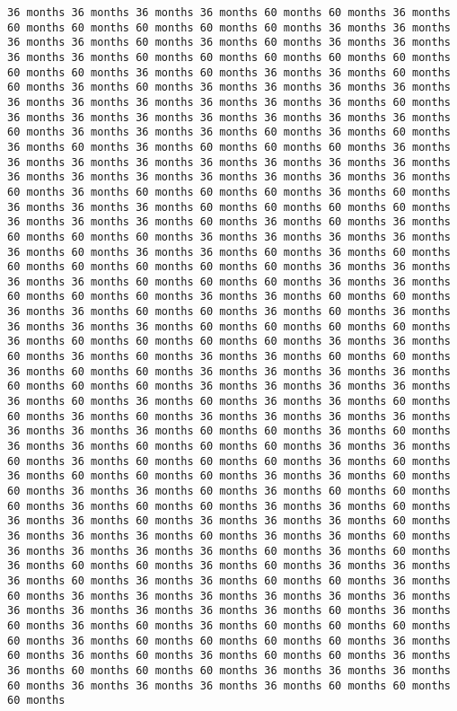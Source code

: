 \documentclass[11pt]{article}
\begin{document}
\begin{Verbatim}[commandchars=\\\{\}, frame=single, framerule=2mm, rulecolor=\color{outerrorbackground}]
36 months 36 months 36 months 36 months 60 months 60 months 36 months 60 months 60 months 60 months 60 months 60 months 36 months 36 months 36 months 36 months 60 months 36 months 60 months 36 months 36 months 36 months 36 months 60 months 60 months 60 months 60 months 60 months 60 months 60 months 36 months 60 months 36 months 36 months 60 months 60 months 36 months 60 months 36 months 36 months 36 months 36 months 36 months 36 months 36 months 36 months 36 months 36 months 60 months 36 months 36 months 36 months 36 months 36 months 36 months 36 months 60 months 36 months 36 months 36 months 60 months 36 months 60 months 36 months 60 months 36 months 60 months 60 months 60 months 36 months 36 months 36 months 36 months 36 months 36 months 36 months 36 months 36 months 36 months 36 months 36 months 36 months 36 months 36 months 60 months 36 months 60 months 60 months 60 months 36 months 60 months 36 months 36 months 36 months 60 months 60 months 60 months 60 months 36 months 36 months 36 months 60 months 36 months 60 months 36 months 60 months 60 months 60 months 36 months 36 months 36 months 36 months 36 months 60 months 36 months 36 months 60 months 36 months 60 months 60 months 60 months 60 months 60 months 60 months 36 months 36 months 36 months 36 months 60 months 60 months 60 months 36 months 36 months 60 months 60 months 60 months 36 months 36 months 60 months 60 months 36 months 36 months 60 months 60 months 36 months 60 months 36 months 36 months 36 months 36 months 60 months 60 months 60 months 60 months 36 months 60 months 60 months 60 months 60 months 36 months 36 months 60 months 36 months 60 months 36 months 36 months 60 months 60 months 36 months 60 months 60 months 36 months 36 months 36 months 36 months 60 months 60 months 60 months 36 months 36 months 36 months 36 months 36 months 60 months 36 months 60 months 36 months 36 months 60 months 60 months 36 months 60 months 36 months 36 months 36 months 36 months 36 months 36 months 36 months 60 months 60 months 36 months 60 months 36 months 36 months 60 months 60 months 60 months 36 months 36 months 60 months 36 months 60 months 60 months 60 months 36 months 60 months 36 months 60 months 60 months 60 months 36 months 36 months 60 months 60 months 36 months 36 months 60 months 36 months 60 months 60 months 60 months 36 months 60 months 60 months 36 months 36 months 60 months 36 months 36 months 60 months 36 months 36 months 36 months 60 months 36 months 36 months 36 months 60 months 36 months 36 months 60 months 36 months 36 months 36 months 36 months 60 months 36 months 60 months 36 months 60 months 60 months 36 months 60 months 36 months 36 months 36 months 60 months 36 months 36 months 60 months 60 months 36 months 60 months 36 months 36 months 36 months 36 months 36 months 36 months 36 months 36 months 36 months 36 months 36 months 60 months 36 months 60 months 36 months 60 months 36 months 60 months 60 months 60 months 60 months 36 months 60 months 60 months 60 months 60 months 36 months 60 months 36 months 60 months 36 months 60 months 60 months 36 months 36 months 60 months 60 months 60 months 36 months 36 months 36 months 60 months 36 months 36 months 36 months 36 months 60 months 60 months 60 months 
\end{Verbatim}
\end{document}
